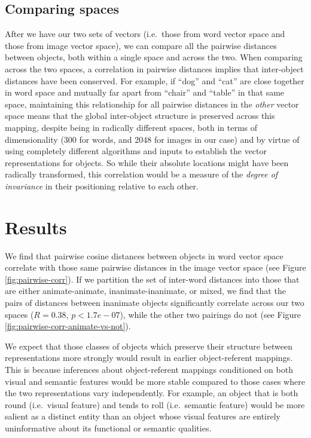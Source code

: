 \documentclass[10pt, letterpaper]{article}
\begin{document}
\subsection{Comparing spaces}\label{comparing-spaces}

After we have our two sets of vectors (i.e.~those from word vector space
and those from image vector space), we can compare all the pairwise
distances between objects, both within a single space and across the
two. When comparing across the two spaces, a correlation in pairwise
distances implies that inter-object distances have been conserved. For
example, if ``dog'' and ``cat'' are close together in word space and
mutually far apart from ``chair'' and ``table'' in that same space,
maintaining this relationship for all pairwise distances in the
\textit{other} vector space means that the global inter-object structure
is preserved across this mapping, despite being in radically different
spaces, both in terms of dimensionality (300 for words, and 2048 for
images in our case) and by virtue of using completely different
algorithms and inputs to establish the vector representations for
objects. So while their absolute locations might have been radically
transformed, this correlation would be a measure of the
\textit{degree of invariance} in their positioning relative to each
other.

\section{Results}\label{results}

We find that pairwise cosine distances between objects in word vector
space correlate with those same pairwise distances in the image vector
space (see Figure \ref{fig:pairwise-corr}). If we partition the set of
inter-word distances into those that are either animate-animate,
inanimate-inanimate, or mixed, we find that the pairs of distances
between inanimate objects significantly correlate across our two spaces
(\(R = 0.38\), \(p < 1.7e-07\)), while the other two pairings do not
(see Figure \ref{fig:pairwise-corr-animate-vs-not}).

We expect that those classes of objects which preserve their structure
between representations more strongly would result in earlier
object-referent mappings. This is because inferences about
object-referent mappings conditioned on both visual and semantic
features would be more stable compared to those cases where the two
representations vary independently. For example, an object that is both
round (i.e.~visual feature) and tends to roll (i.e.~semantic feature)
would be more salient as a distinct entity than an object whose visual
features are entirely uninformative about its functional or semantic
qualities.
\end{document}
